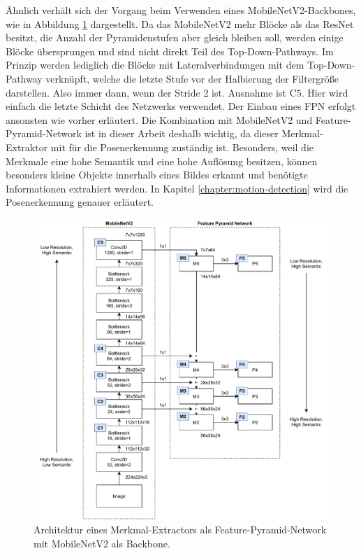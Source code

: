 Ähnlich verhält sich der Vorgang beim Verwenden eines MobileNetV2-Backbones, wie
in Abbildung \ref{fig:mobilenetv2-fpn} dargestellt. Da das MobileNetV2 mehr Blöcke
als das ResNet besitzt, die Anzahl der Pyramidenstufen aber gleich bleiben soll, werden
einige Blöcke übersprungen und sind nicht direkt Teil des Top-Down-Pathways. Im Prinzip
werden lediglich die Blöcke mit Lateralverbindungen mit dem Top-Down-Pathway verknüpft,
welche die letzte Stufe vor der Halbierung der Filtergröße darstellen. Also immer dann,
wenn der Stride 2 ist. Ausnahme ist C5. Hier wird einfach die letzte Schicht des Netzwerks
verwendet. Der Einbau eines FPN erfolgt ansonsten wie vorher erläutert. Die Kombination mit
MobileNetV2 und Feature-Pyramid-Network ist in dieser Arbeit deshalb wichtig, da dieser
Merkmal-Extraktor mit für die Posenerkennung zuständig ist. Besonders, weil die
Merkmale
eine hohe Semantik und eine hohe Auflösung besitzen, können besonders kleine Objekte innerhalb
eines Bildes erkannt und benötigte Informationen extrahiert werden. In Kapitel \ref{chapter:motion-detection}
wird die Posenerkennung genauer erläutert.

\begin{figure}
    \includegraphics[width=\textwidth]{images/MobileNetV2_FPN.pdf}
    \caption{Architektur eines Merkmal-Extractors als Feature-Pyramid-Network
    mit MobileNetV2 als Backbone.}
    \label{fig:mobilenetv2-fpn}
\end{figure}
